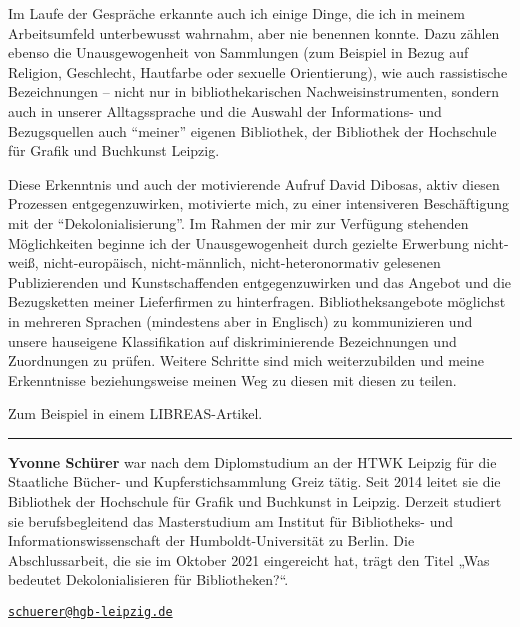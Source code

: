 \documentclass[a4paper,
fontsize=11pt,
oneside,
numbers=noperiodatend,
parskip=half-,
bibliography=totoc,
final
]{scrartcl}
\begin{document}
Im Laufe der Gespräche erkannte auch ich einige Dinge, die ich in meinem
Arbeitsumfeld unterbewusst wahrnahm, aber nie benennen konnte. Dazu
zählen ebenso die Unausgewogenheit von Sammlungen (zum Beispiel in Bezug
auf Religion, Geschlecht, Hautfarbe oder sexuelle Orientierung), wie
auch rassistische Bezeichnungen -- nicht nur in bibliothekarischen
Nachweisinstrumenten, sondern auch in unserer Alltagssprache und die
Auswahl der Informations- und Bezugsquellen auch \enquote{meiner}
eigenen Bibliothek, der Bibliothek der Hochschule für Grafik und
Buchkunst Leipzig.

Diese Erkenntnis und auch der motivierende Aufruf David Dibosas, aktiv
diesen Prozessen entgegenzuwirken, motivierte mich, zu einer
intensiveren Beschäftigung mit der \enquote{Dekolonialisierung}. Im
Rahmen der mir zur Verfügung stehenden Möglichkeiten beginne ich der
Unausgewogenheit durch gezielte Erwerbung nicht-weiß, nicht-europäisch,
nicht-männlich, nicht-heteronormativ gelesenen Publizierenden und
Kunstschaffenden entgegenzuwirken und das Angebot und die Bezugsketten
meiner Lieferfirmen zu hinterfragen. Bibliotheksangebote möglichst in
mehreren Sprachen (mindestens aber in Englisch) zu kommunizieren und
unsere hauseigene Klassifikation auf diskriminierende Bezeichnungen und
Zuordnungen zu prüfen. Weitere Schritte sind mich weiterzubilden und
meine Erkenntnisse beziehungsweise meinen Weg zu diesen mit diesen zu
teilen.

Zum Beispiel in einem LIBREAS-Artikel.

\begin{center}\rule{0.5\linewidth}{0.5pt}\end{center}

\textbf{Yvonne Schürer} war nach dem Diplomstudium an der HTWK Leipzig
für die Staatliche Bücher- und Kupferstichsammlung Greiz tätig. Seit
2014 leitet sie die Bibliothek der Hochschule für Grafik und Buchkunst
in Leipzig. Derzeit studiert sie berufsbegleitend das Masterstudium am
Institut für Bibliotheks- und Informationswissenschaft der
Humboldt-Universität zu Berlin. Die Abschlussarbeit, die sie im Oktober
2021 eingereicht hat, trägt den Titel „Was bedeutet Dekolonialisieren
für Bibliotheken?{}``.

\href{mailto:schuerer@hgb-leipzig.de}{\nolinkurl{schuerer@hgb-leipzig.de}}
\end{document}
